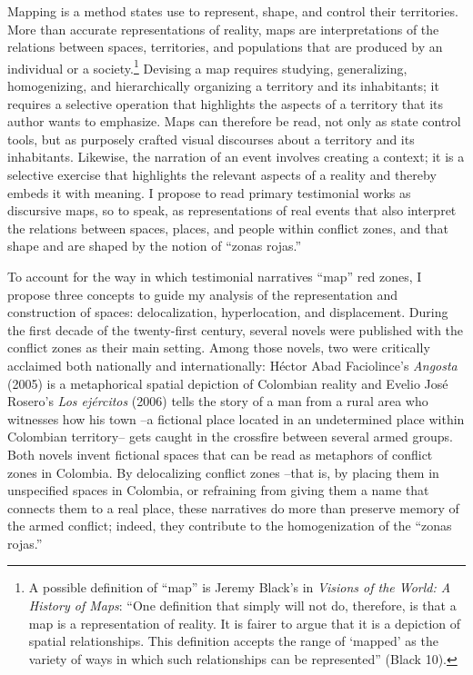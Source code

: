 \documentclass[
  11pt,
,
onecolumn,
openany
]{book}
\begin{document}
Mapping is a method states use to represent, shape, and control their
territories. More than accurate representations of reality, maps are
interpretations of the relations between spaces, territories, and populations
that are produced by an individual or a society.\footnote{A possible
  definition of ``map'' is Jeremy Black's in \emph{Visions of the World: A
  History of Maps}: ``One definition that simply will not do, therefore, is
  that a map is a representation of reality. It is fairer to argue that it is
  a depiction of spatial relationships. This definition accepts the range of
  `mapped' as the variety of ways in which such relationships can be
  represented'' (Black 10).} Devising a map requires studying, generalizing,
homogenizing, and hierarchically organizing a territory and its inhabitants;
it requires a selective operation that highlights the aspects of a territory
that its author wants to emphasize. Maps can therefore be read, not only as
state control tools, but as purposely crafted visual discourses about a
territory and its inhabitants. Likewise, the narration of an event involves
creating a context; it is a selective exercise that highlights the relevant
aspects of a reality and thereby embeds it with meaning. I propose to read
primary testimonial works as discursive maps, so to speak, as representations
of real events that also interpret the relations between spaces, places, and
people within conflict zones, and that shape and are shaped by the notion of
``zonas rojas.''

To account for the way in which testimonial narratives ``map'' red zones, I
propose three concepts to guide my analysis of the representation and
construction of spaces: delocalization, hyperlocation, and displacement.
During the first decade of the twenty-first century, several novels were
published with the conflict zones as their main setting. Among those novels,
two were critically acclaimed both nationally and internationally: Héctor Abad
Faciolince's \emph{Angosta} (2005) is a metaphorical spatial depiction of
Colombian reality and Evelio José Rosero's \emph{Los ejércitos} (2006) tells
the story of a man from a rural area who witnesses how his town --a fictional
place located in an undetermined place within Colombian territory-- gets
caught in the crossfire between several armed groups. Both novels invent
fictional spaces that can be read as metaphors of conflict zones in Colombia.
By delocalizing conflict zones --that is, by placing them in unspecified
spaces in Colombia, or refraining from giving them a name that connects them
to a real place, these narratives do more than preserve memory of the armed
conflict; indeed, they contribute to the homogenization of the ``zonas
rojas.''
\end{document}
